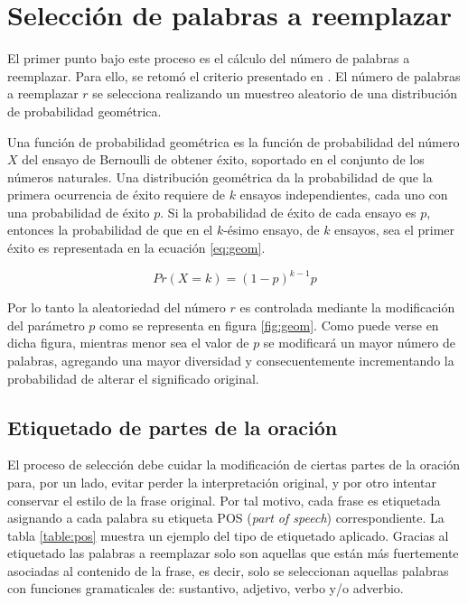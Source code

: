\section{Selección de palabras a reemplazar}

El primer punto bajo este proceso es el cálculo del número de palabras a reemplazar. Para ello, se retomó el criterio presentado en \citep{zhang2015character}. El número de palabras a reemplazar $r$ se selecciona realizando un muestreo aleatorio de una distribución de probabilidad geométrica. 

Una función de probabilidad geométrica es la función de probabilidad del número $X$ del ensayo de Bernoulli de obtener éxito, soportado en el conjunto de los números naturales. Una distribución geométrica da la probabilidad de que la primera ocurrencia de éxito requiere de $k$ ensayos independientes, cada uno con una probabilidad de éxito $p$. Si la probabilidad de éxito de cada ensayo es $p$, entonces la probabilidad de que en el $k$-ésimo ensayo, de $k$ ensayos, sea el primer éxito es representada en la ecuación \ref{eq:geom}.

\begin{equation} \label{eq:geom}
    Pr(X=k)=(1-p)^{k-1}p
\end{equation}

Por lo tanto la aleatoriedad del número $r$ es controlada mediante la modificación del parámetro $p$ como se representa en figura \ref{fig:geom}. Como puede verse en dicha figura, mientras menor sea el valor de $p$ se modificará un mayor número de palabras, agregando una mayor diversidad  y consecuentemente incrementando la probabilidad de alterar el significado original. 


\subsection{Etiquetado de partes de la oración}

El proceso de selección debe cuidar la modificación de ciertas partes de la oración para, por un lado, evitar perder la interpretación original, y por otro intentar conservar el estilo de la frase original. Por tal motivo, cada frase es etiquetada asignando a cada palabra su etiqueta POS (\textit{part of speech}) correspondiente. La tabla \ref{table:pos} muestra un ejemplo del tipo de etiquetado aplicado. Gracias al etiquetado las palabras a reemplazar solo son aquellas que están más fuertemente asociadas al contenido de la frase, es decir, solo se seleccionan aquellas palabras con funciones gramaticales de: sustantivo, adjetivo, verbo y/o adverbio.

